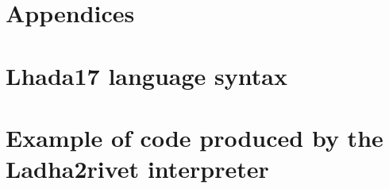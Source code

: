 \documentclass[11pt]{cernrep}
\begin{document}


\section*{Appendices}

\appendix

\section{{\sc Lhada17} language syntax}\label{app:ebnf}


\section{Example of code produced by the {\sc Ladha2rivet} interpreter}\label{app:code}

\end{document}
